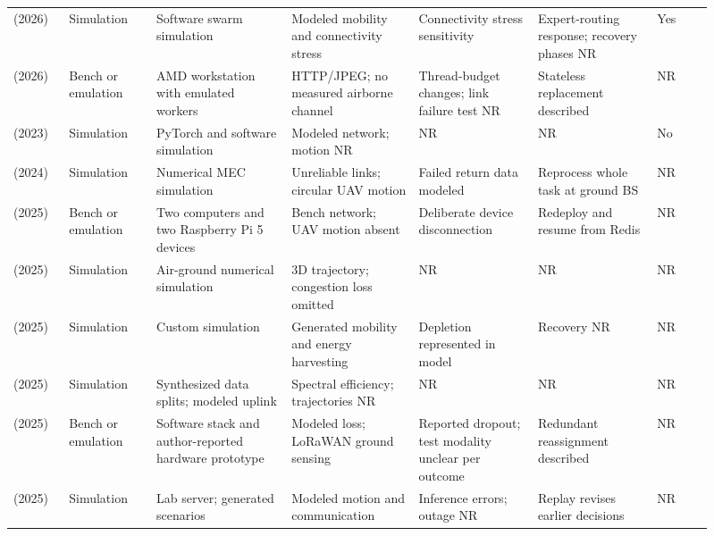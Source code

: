 \begin{longtable}{@{}Y{0.075\linewidth}Y{0.116\linewidth}Y{0.17\linewidth}Y{0.163\linewidth}Y{0.156\linewidth}Y{0.153\linewidth}Y{0.077\linewidth}@{}}
\cite{R0118}\newline\mbox{(2026)} & Simulation & Software swarm simulation & Modeled mobility and connectivity stress & Connectivity stress sensitivity & Expert-routing response; recovery phases NR & Yes \\
\cite{R0125}\newline\mbox{(2026)} & Bench or emulation & AMD workstation with emulated workers & HTTP\allowbreak{}/JPEG; no measured airborne channel & Thread-budget changes; link failure test NR & Stateless replacement described & NR \\
\cite{R0089}\newline\mbox{(2023)} & Simulation & PyTorch and software simulation & Modeled network; motion NR & NR & NR & No \\
\cite{R0044}\newline\mbox{(2024)} & Simulation & Numerical MEC simulation & Unreliable links; circular UAV motion & Failed return data modeled & Reprocess whole task at ground BS & NR \\
\cite{R0038}\newline\mbox{(2025)} & Bench or emulation & Two computers and two Raspberry Pi 5 devices & Bench network; UAV motion absent & Deliberate device disconnection & Redeploy and resume from Redis & NR \\
\cite{R0064}\newline\mbox{(2025)} & Simulation & Air-ground numerical simulation & 3D trajectory; congestion loss omitted & NR & NR & NR \\
\cite{R0071}\newline\mbox{(2025)} & Simulation & Custom simulation & Generated mobility and energy harvesting & Depletion represented in model & Recovery NR & NR \\
\cite{R0080}\newline\mbox{(2025)} & Simulation & Synthesized data splits; modeled uplink & Spectral efficiency; trajectories NR & NR & NR & NR \\
\cite{R0090}\newline\mbox{(2025)} & Bench or emulation & Software stack and author-reported hardware prototype & Modeled loss; LoRaWAN ground sensing & Reported dropout; test modality unclear per outcome & Redundant reassignment described & NR \\
\cite{R0145}\newline\mbox{(2025)} & Simulation & Lab server; generated scenarios & Modeled motion and communication & Inference errors; outage NR & Replay revises earlier decisions & NR \\

\end{longtable}
